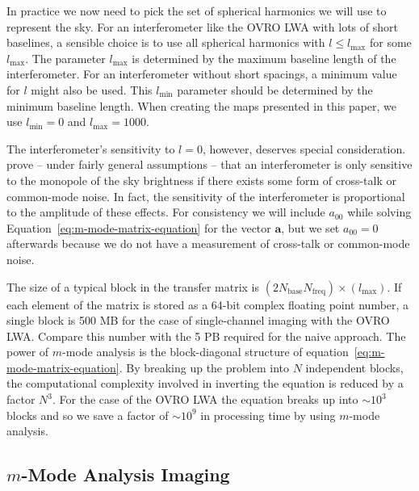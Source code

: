 \documentclass[twocolumn]{aastex6}
\renewcommand{\b}{\pmb}
\begin{document}
In practice we now need to pick the set of spherical harmonics we will use to represent the sky. For
an interferometer like the OVRO LWA with lots of short baselines, a sensible choice is to use all
spherical harmonics with $l\le l_\text{max}$ for some $l_\text{max}$. The parameter $l_\text{max}$
is determined by the maximum baseline length of the interferometer.  For an interferometer without
short spacings, a minimum value for $l$ might also be used. This $l_\text{min}$ parameter should be
determined by the minimum baseline length.  When creating the maps presented in this paper, we use
$l_\text{min} = 0$ and $l_\text{max} = 1000$.

The interferometer's sensitivity to $l=0$, however, deserves special consideration.
\citet{2016ApJ...826..116V} prove -- under fairly general assumptions -- that an interferometer is
only sensitive to the monopole of the sky brightness if there exists some form of cross-talk or
common-mode noise. In fact, the sensitivity of the interferometer is proportional to the amplitude
of these effects. For consistency we will include $a_{00}$ while solving
Equation~\ref{eq:m-mode-matrix-equation} for the vector $\b a$, but we set $a_{00} = 0$ afterwards
because we do not have a measurement of cross-talk or common-mode noise.

The size of a typical block in the transfer matrix is
$(2N_\text{base}N_\text{freq})\times(l_\text{max})$. If each element of the matrix is stored as a
64-bit complex floating point number, a single block is 500 MB for the case of single-channel
imaging with the OVRO LWA. Compare this number with the 5 PB required for the naive approach.  The
power of $m$-mode analysis is the block-diagonal structure of
equation~\ref{eq:m-mode-matrix-equation}.  By breaking up the problem into $N$ independent blocks,
the computational complexity involved in inverting the equation is reduced by a factor $N^3$. For
the case of the OVRO LWA the equation breaks up into $\sim10^3$ blocks and so we save a factor of
$\sim10^9$ in processing time by using $m$-mode analysis.

\subsection{$m$-Mode Analysis Imaging}
\end{document}
